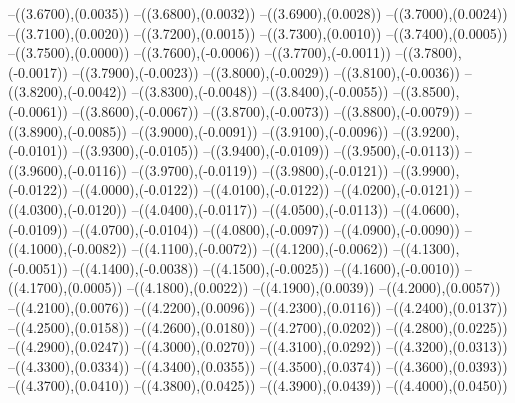 {	--({\sx*(3.6700)},{\sy*(0.0035)})
	--({\sx*(3.6800)},{\sy*(0.0032)})
	--({\sx*(3.6900)},{\sy*(0.0028)})
	--({\sx*(3.7000)},{\sy*(0.0024)})
	--({\sx*(3.7100)},{\sy*(0.0020)})
	--({\sx*(3.7200)},{\sy*(0.0015)})
	--({\sx*(3.7300)},{\sy*(0.0010)})
	--({\sx*(3.7400)},{\sy*(0.0005)})
	--({\sx*(3.7500)},{\sy*(0.0000)})
	--({\sx*(3.7600)},{\sy*(-0.0006)})
	--({\sx*(3.7700)},{\sy*(-0.0011)})
	--({\sx*(3.7800)},{\sy*(-0.0017)})
	--({\sx*(3.7900)},{\sy*(-0.0023)})
	--({\sx*(3.8000)},{\sy*(-0.0029)})
	--({\sx*(3.8100)},{\sy*(-0.0036)})
	--({\sx*(3.8200)},{\sy*(-0.0042)})
	--({\sx*(3.8300)},{\sy*(-0.0048)})
	--({\sx*(3.8400)},{\sy*(-0.0055)})
	--({\sx*(3.8500)},{\sy*(-0.0061)})
	--({\sx*(3.8600)},{\sy*(-0.0067)})
	--({\sx*(3.8700)},{\sy*(-0.0073)})
	--({\sx*(3.8800)},{\sy*(-0.0079)})
	--({\sx*(3.8900)},{\sy*(-0.0085)})
	--({\sx*(3.9000)},{\sy*(-0.0091)})
	--({\sx*(3.9100)},{\sy*(-0.0096)})
	--({\sx*(3.9200)},{\sy*(-0.0101)})
	--({\sx*(3.9300)},{\sy*(-0.0105)})
	--({\sx*(3.9400)},{\sy*(-0.0109)})
	--({\sx*(3.9500)},{\sy*(-0.0113)})
	--({\sx*(3.9600)},{\sy*(-0.0116)})
	--({\sx*(3.9700)},{\sy*(-0.0119)})
	--({\sx*(3.9800)},{\sy*(-0.0121)})
	--({\sx*(3.9900)},{\sy*(-0.0122)})
	--({\sx*(4.0000)},{\sy*(-0.0122)})
	--({\sx*(4.0100)},{\sy*(-0.0122)})
	--({\sx*(4.0200)},{\sy*(-0.0121)})
	--({\sx*(4.0300)},{\sy*(-0.0120)})
	--({\sx*(4.0400)},{\sy*(-0.0117)})
	--({\sx*(4.0500)},{\sy*(-0.0113)})
	--({\sx*(4.0600)},{\sy*(-0.0109)})
	--({\sx*(4.0700)},{\sy*(-0.0104)})
	--({\sx*(4.0800)},{\sy*(-0.0097)})
	--({\sx*(4.0900)},{\sy*(-0.0090)})
	--({\sx*(4.1000)},{\sy*(-0.0082)})
	--({\sx*(4.1100)},{\sy*(-0.0072)})
	--({\sx*(4.1200)},{\sy*(-0.0062)})
	--({\sx*(4.1300)},{\sy*(-0.0051)})
	--({\sx*(4.1400)},{\sy*(-0.0038)})
	--({\sx*(4.1500)},{\sy*(-0.0025)})
	--({\sx*(4.1600)},{\sy*(-0.0010)})
	--({\sx*(4.1700)},{\sy*(0.0005)})
	--({\sx*(4.1800)},{\sy*(0.0022)})
	--({\sx*(4.1900)},{\sy*(0.0039)})
	--({\sx*(4.2000)},{\sy*(0.0057)})
	--({\sx*(4.2100)},{\sy*(0.0076)})
	--({\sx*(4.2200)},{\sy*(0.0096)})
	--({\sx*(4.2300)},{\sy*(0.0116)})
	--({\sx*(4.2400)},{\sy*(0.0137)})
	--({\sx*(4.2500)},{\sy*(0.0158)})
	--({\sx*(4.2600)},{\sy*(0.0180)})
	--({\sx*(4.2700)},{\sy*(0.0202)})
	--({\sx*(4.2800)},{\sy*(0.0225)})
	--({\sx*(4.2900)},{\sy*(0.0247)})
	--({\sx*(4.3000)},{\sy*(0.0270)})
	--({\sx*(4.3100)},{\sy*(0.0292)})
	--({\sx*(4.3200)},{\sy*(0.0313)})
	--({\sx*(4.3300)},{\sy*(0.0334)})
	--({\sx*(4.3400)},{\sy*(0.0355)})
	--({\sx*(4.3500)},{\sy*(0.0374)})
	--({\sx*(4.3600)},{\sy*(0.0393)})
	--({\sx*(4.3700)},{\sy*(0.0410)})
	--({\sx*(4.3800)},{\sy*(0.0425)})
	--({\sx*(4.3900)},{\sy*(0.0439)})
	--({\sx*(4.4000)},{\sy*(0.0450)})
}

